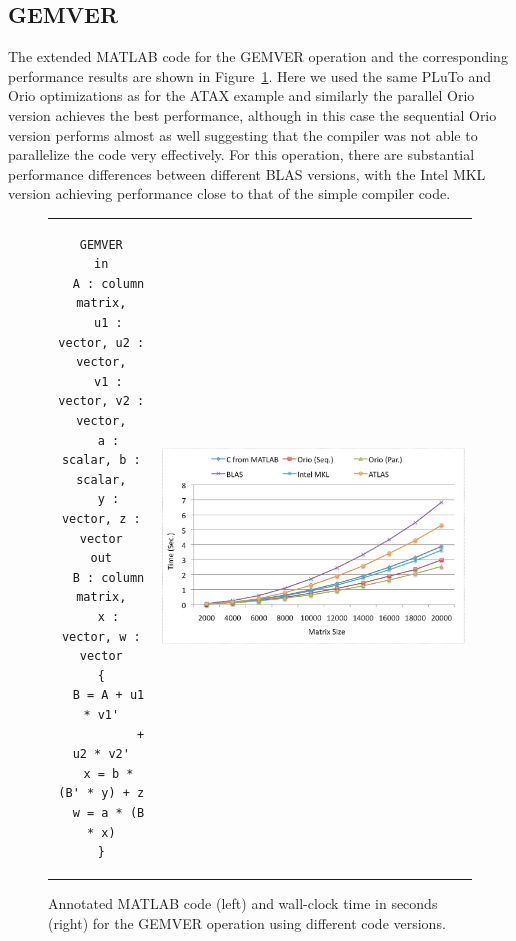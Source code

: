 \documentclass[runningheads]{llncs}
\begin{document}
\subsection{GEMVER}


The extended MATLAB code for the GEMVER operation and the corresponding performance results are shown in Figure~\ref{fig:gemver}. Here we used the same PLuTo and Orio optimizations as for the ATAX example and similarly the parallel Orio version achieves the best performance, although in this case the sequential Orio version performs almost as well suggesting that the compiler was not able to parallelize the code very effectively. For this operation, there are substantial performance differences between different BLAS versions, with the Intel MKL version achieving performance close to that of the simple compiler code.
\begin{figure}[htp]
\centering
\begin{tabular}{cc}
\begin{minipage}[b]{.3\textwidth}
\footnotesize
\begin{verbatim}
GEMVER
in
  A : column matrix,
  u1 : vector, u2 : vector,
  v1 : vector, v2 : vector,
  a : scalar, b : scalar,
  y : vector, z : vector
out
  B : column matrix,
  x : vector, w : vector
{
  B = A + u1 * v1'
           + u2 * v2'
  x = b * (B' * y) + z
  w = a * (B * x)
}
\end{verbatim}
\end{minipage}
&
\begin{minipage}[b]{.6\textwidth}
\includegraphics[width=\textwidth]{figures/gemver.eps}
\end{minipage}\\
\end{tabular}
\caption{Annotated MATLAB code (left) and wall-clock time in seconds (right) for the GEMVER operation using different code versions.}
\label{fig:gemver}
\end{figure}
\end{document}
